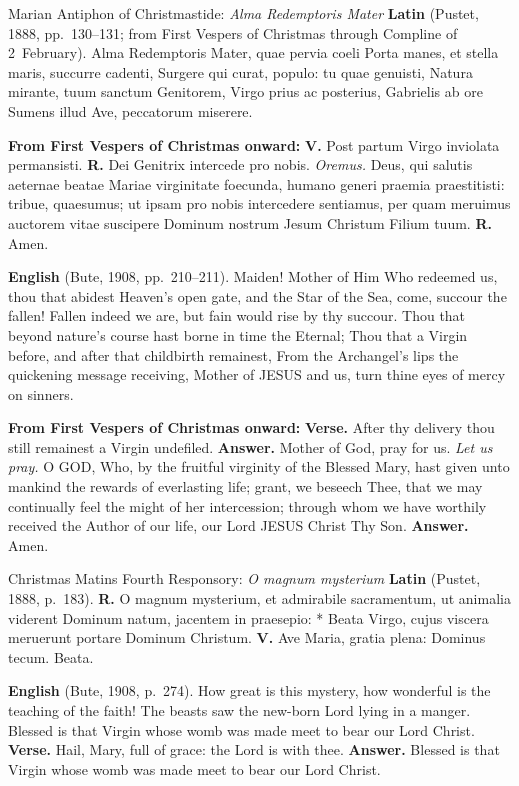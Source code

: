 \begin{massbox}{Marian Antiphon of Christmastide: \textit{Alma Redemptoris Mater}}
\textbf{Latin} (Pustet, 1888, pp.~130--131; from First Vespers of Christmas
through Compline of 2~February). Alma Redemptoris Mater, quae pervia coeli Porta
manes, et stella maris, succurre cadenti, Surgere qui curat, populo: tu quae
genuisti, Natura mirante, tuum sanctum Genitorem, Virgo prius ac posterius,
Gabrielis ab ore Sumens illud Ave, peccatorum miserere.

\textbf{From First Vespers of Christmas onward:} \textbf{V.} Post partum Virgo
inviolata permansisti. \textbf{R.} Dei Genitrix intercede pro nobis.
\textit{Oremus.} Deus, qui salutis aeternae beatae Mariae virginitate foecunda,
humano generi praemia praestitisti: tribue, quaesumus; ut ipsam pro nobis
intercedere sentiamus, per quam meruimus auctorem vitae suscipere Dominum
nostrum Jesum Christum Filium tuum. \textbf{R.} Amen.

\textbf{English} (Bute, 1908, pp.~210--211). Maiden! Mother of Him Who redeemed
us, thou that abidest Heaven's open gate, and the Star of the Sea, come, succour
the fallen! Fallen indeed we are, but fain would rise by thy succour. Thou that
beyond nature's course hast borne in time the Eternal; Thou that a Virgin
before, and after that childbirth remainest, From the Archangel's lips the
quickening message receiving, Mother of JESUS and us, turn thine eyes of mercy on
sinners.

\textbf{From First Vespers of Christmas onward:} \textbf{Verse.} After thy
delivery thou still remainest a Virgin undefiled. \textbf{Answer.} Mother of
God, pray for us. \textit{Let us pray.} O GOD, Who, by the fruitful virginity of
the Blessed Mary, hast given unto mankind the rewards of everlasting life;
grant, we beseech Thee, that we may continually feel the might of her
intercession; through whom we have worthily received the Author of our life, our
Lord JESUS Christ Thy Son. \textbf{Answer.} Amen.
\end{massbox}

\begin{massbox}{Christmas Matins Fourth Responsory: \textit{O magnum mysterium}}
\textbf{Latin} (Pustet, 1888, p.~183). \textbf{R.} O magnum mysterium, et
admirabile sacramentum, ut animalia viderent Dominum natum, jacentem in
praesepio: * Beata Virgo, cujus viscera meruerunt portare Dominum Christum.
\textbf{V.} Ave Maria, gratia plena: Dominus tecum. Beata.

\textbf{English} (Bute, 1908, p.~274). How great is this mystery, how wonderful
is the teaching of the faith! The beasts saw the new-born Lord lying in a
manger. Blessed is that Virgin whose womb was made meet to bear our Lord Christ.
\textbf{Verse.} Hail, Mary, full of grace: the Lord is with thee.
\textbf{Answer.} Blessed is that Virgin whose womb was made meet to bear our
Lord Christ.
\end{massbox}

